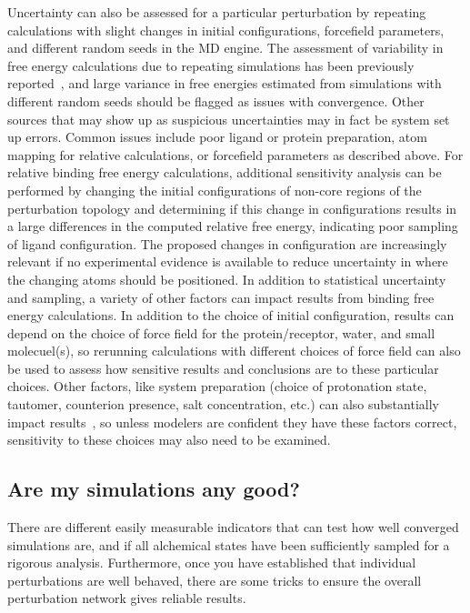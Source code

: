 \documentclass[9pt,bestpractices]{livecoms}
\begin{document}
%
Uncertainty can also be assessed for a particular perturbation by repeating calculations with slight changes in initial configurations, forcefield parameters, and different random seeds in the MD engine. 
The assessment of variability in free energy calculations due to repeating simulations has been previously reported~\cite{aldeghi2019accurate,paliwal2011benchmark,mey2016blinded,mey2018impact}, and large variance in free energies estimated from simulations with different random seeds should be flagged as issues with convergence. 
Other sources that may show up as suspicious uncertainties may in fact be system set up errors. Common issues include poor ligand or protein preparation, atom mapping for relative calculations, or forcefield parameters as described above.
%
For relative binding free energy calculations, additional sensitivity analysis can be performed by changing the initial configurations of non-core regions of the perturbation topology and determining if this change in configurations results in a large differences in the computed relative free energy, indicating poor sampling of ligand configuration.
The proposed changes in configuration are increasingly relevant if no experimental evidence is available to reduce uncertainty in where the changing atoms should be positioned.
%
In addition to statistical uncertainty and sampling, a variety of other factors can impact results from binding free energy calculations. In addition to the choice of initial configuration, results can depend on the choice of force field for the protein/receptor, water, and small molecuel(s), so rerunning calculations with different choices of force field can also be used to assess how sensitive results and conclusions are to these particular choices. Other factors, like system preparation (choice of protonation state, tautomer, counterion presence, salt concentration, etc.) can also substantially impact results~\cite{mobley2017predicting, mobley2017predictingb}, so unless modelers are confident they have these factors correct, sensitivity to these choices may also need to be examined.
%
\subsection{Are my simulations any good?}
\label{sec:are-they-good}
There are different easily measurable indicators that can test how well converged simulations are, and if all alchemical states have been sufficiently sampled for a rigorous analysis. Furthermore, once you have established that individual perturbations are well behaved, there are some tricks to ensure the overall perturbation network gives reliable results.
%
\end{document}

